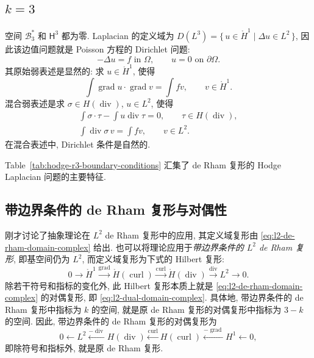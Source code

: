 \subsection{$k=3$}\label{subsec:hodge-r3-k3}

{空间 $\mathcal B_3^*$ 和 $\mathsf H^3$ 都为零. Laplacian 的定义域为 $D(L^3)=\{\,u\in\mathring H^1\mid\Delta u\in L^2\,\}$, 因此该边值问题就是 Poisson 方程的 Dirichlet 问题:}
\[
-\Delta u=f\text{ in }\Omega,\qquad u=0\text{ on }\partial\Omega.
\]
{其原始弱表述是显然的: 求 $u\in\mathring H^1$, 使得}
\[
\int\operatorname{grad}u\cdot\operatorname{grad}v=\int fv,\qquad v\in\mathring H^1.
\]
{混合弱表述是求 $\sigma\in H(\operatorname{div})$, $u\in L^2$, 使得}
\[
\begin{gathered}
\int\sigma\cdot\tau-\int u\operatorname{div}\tau=0,\qquad\tau\in H(\operatorname{div}),\\
\int\operatorname{div}\sigma\,v=\int fv,\qquad v\in L^2.
\end{gathered}
\]
{在混合表述中, Dirichlet 条件是自然的.}

{Table~\ref{tab:hodge-r3-boundary-conditions} 汇集了 de Rham 复形的 Hodge Laplacian 问题的主要特征.}

\subsection{{带边界条件的 de Rham 复形与对偶性}}\label{subsec:de-rham-boundary-duality}

{刚才讨论了抽象理论在 $L^2$ de Rham 复形中的应用, 其定义域复形由 \eqref{eq:l2-de-rham-domain-complex} 给出. 也可以将理论应用于\emph{带边界条件的 $L^2$ de Rham 复形}, 即基空间仍为 $L^2$, 而定义域复形为下式的 Hilbert 复形:}
\[
0\to\mathring H^1\xrightarrow{\operatorname{grad}}\mathring H(\operatorname{curl})\xrightarrow{\operatorname{curl}}\mathring H(\operatorname{div})\xrightarrow{\operatorname{div}}L^2\to0.
\]
{除若干符号和指标的变化外, 此 Hilbert 复形本质上就是 \eqref{eq:l2-de-rham-domain-complex} 的对偶复形, 即 \eqref{eq:l2-dual-domain-complex}. 具体地, 带边界条件的 de Rham 复形中指标为 $k$ 的空间, 就是原 de Rham 复形的对偶复形中指标为 $3-k$ 的空间. 因此, 带边界条件的 de Rham 复形的对偶复形为}
\[
0\leftarrow L^2\xleftarrow{-\operatorname{div}}H(\operatorname{div})\xleftarrow{\operatorname{curl}}H(\operatorname{curl})\xleftarrow{-\operatorname{grad}}H^1\leftarrow0,
\]
{即除符号和指标外, 就是原 de Rham 复形.}

